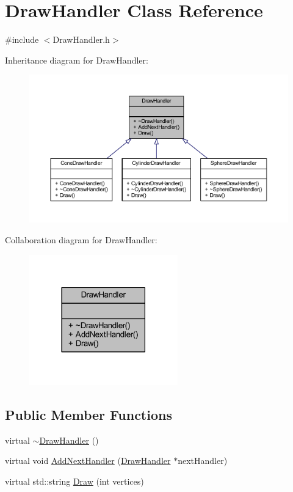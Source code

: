 \hypertarget{class_draw_handler}{}\section{Draw\+Handler Class Reference}
\label{class_draw_handler}


{\ttfamily \#include $<$Draw\+Handler.\+h$>$}



Inheritance diagram for Draw\+Handler\+:\nopagebreak
\begin{figure}[H]
\begin{center}
\leavevmode
\includegraphics[width=350pt]{class_draw_handler__inherit__graph}
\end{center}
\end{figure}


Collaboration diagram for Draw\+Handler\+:\nopagebreak
\begin{figure}[H]
\begin{center}
\leavevmode
\includegraphics[width=182pt]{class_draw_handler__coll__graph}
\end{center}
\end{figure}
\subsection*{Public Member Functions}
\begin{DoxyCompactItemize}
\item 
virtual \mbox{\hyperlink{class_draw_handler_a631712b3bd0cdbf327065194c5cf46f5}{$\sim$\+Draw\+Handler}} ()
\item 
virtual void \mbox{\hyperlink{class_draw_handler_ac579261b9482644c32b162b1cd2e6780}{Add\+Next\+Handler}} (\mbox{\hyperlink{class_draw_handler}{Draw\+Handler}} $\ast$next\+Handler)
\item 
virtual std\+::string \mbox{\hyperlink{class_draw_handler_af52aafccdd1397441a17a2d36174a1e4}{Draw}} (int vertices)
\end{DoxyCompactItemize}


